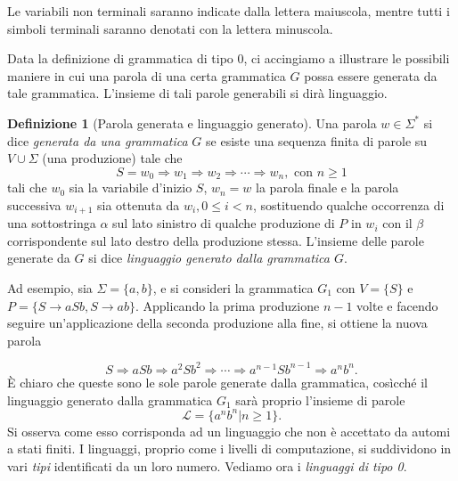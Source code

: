 \documentclass[10pt]{\classname}
\theoremstyle{definition}
\newtheorem{definizione}{Definizione}[section]
\theoremstyle{definition}
\theoremstyle{definition}
\theoremstyle{definition}
\begin{document}
Le variabili non terminali saranno indicate dalla lettera maiuscola, mentre
tutti i simboli terminali saranno denotati con la lettera minuscola.

Data la definizione di grammatica di tipo 0, ci accingiamo a illustrare le
possibili maniere in cui una parola di una certa grammatica $G$ possa essere
generata da tale grammatica. L'insieme di tali parole generabili si dirà
linguaggio.

\begin{definizione}[Parola generata e linguaggio generato]
    Una parola $w \in \Sigma^*$ si dice \emph{generata da una grammatica} $G$ se esiste una sequenza finita di parole su $V \cup \Sigma$ (una produzione) tale che $$S = w_0 \Rightarrow w_1 \Rightarrow w_2 \Rightarrow \cdots \Rightarrow w_n, \mbox{ con } n \geq 1$$ tali che $w_0$ sia la variabile d'inizio $S$, $w_n = w$ la parola finale e la parola successiva $w_{i+1}$ sia ottenuta da $w_i, 0 \leq i < n$, sostituendo qualche occorrenza di una sottostringa $\alpha$ sul lato sinistro di qualche produzione di $P$ in $w_i$ con il $\beta$ corrispondente sul lato destro della produzione stessa. L'insieme delle parole generate da $G$ si dice \emph{linguaggio generato dalla grammatica $G$}.
\end{definizione}

Ad esempio, sia $\Sigma = \{a, b\}$, e si consideri la grammatica $G_1$ con $V
= \{S\}$ e $P = \{S \rightarrow aSb, S \rightarrow ab\}.$ Applicando la prima
produzione $n-1$ volte e facendo seguire un'applicazione della seconda
produzione alla fine, si ottiene la nuova parola

$$S \Rightarrow aSb \Rightarrow a^2Sb^2 \Rightarrow \cdots \Rightarrow
a^{n-1}Sb^{n-1} \Rightarrow a^{n}b^{n}.$$ È chiaro che queste sono le sole
parole generate dalla grammatica, cosìcché il linguaggio generato dalla
grammatica $G_1$ sarà proprio l'insieme di parole \[\mathcal L = \{a^n b^n | n\geq 1\}.\] Si osserva come esso corrisponda ad un linguaggio che non è accettato da automi a stati finiti. I linguaggi, proprio come i livelli di computazione, si suddividono in vari \emph{tipi} identificati da un loro numero. Vediamo ora i \emph{linguaggi di tipo 0}.
\end{document}
